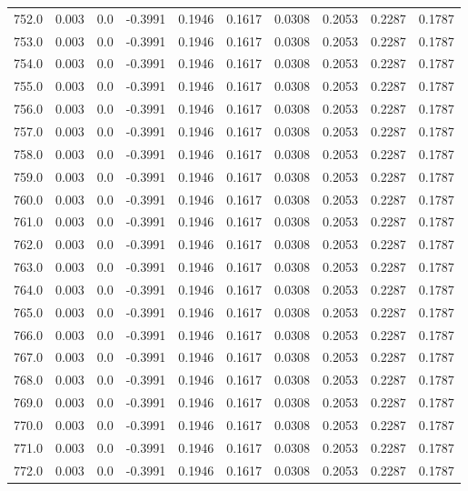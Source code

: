 \begin{longtable}{lrrrrrrrrr}
752.0 & 0.003 & 0.0 & -0.3991 & 0.1946 & 0.1617 & 0.0308 & 0.2053 & 0.2287 & 0.1787 \\
753.0 & 0.003 & 0.0 & -0.3991 & 0.1946 & 0.1617 & 0.0308 & 0.2053 & 0.2287 & 0.1787 \\
754.0 & 0.003 & 0.0 & -0.3991 & 0.1946 & 0.1617 & 0.0308 & 0.2053 & 0.2287 & 0.1787 \\
755.0 & 0.003 & 0.0 & -0.3991 & 0.1946 & 0.1617 & 0.0308 & 0.2053 & 0.2287 & 0.1787 \\
756.0 & 0.003 & 0.0 & -0.3991 & 0.1946 & 0.1617 & 0.0308 & 0.2053 & 0.2287 & 0.1787 \\
757.0 & 0.003 & 0.0 & -0.3991 & 0.1946 & 0.1617 & 0.0308 & 0.2053 & 0.2287 & 0.1787 \\
758.0 & 0.003 & 0.0 & -0.3991 & 0.1946 & 0.1617 & 0.0308 & 0.2053 & 0.2287 & 0.1787 \\
759.0 & 0.003 & 0.0 & -0.3991 & 0.1946 & 0.1617 & 0.0308 & 0.2053 & 0.2287 & 0.1787 \\
760.0 & 0.003 & 0.0 & -0.3991 & 0.1946 & 0.1617 & 0.0308 & 0.2053 & 0.2287 & 0.1787 \\
761.0 & 0.003 & 0.0 & -0.3991 & 0.1946 & 0.1617 & 0.0308 & 0.2053 & 0.2287 & 0.1787 \\
762.0 & 0.003 & 0.0 & -0.3991 & 0.1946 & 0.1617 & 0.0308 & 0.2053 & 0.2287 & 0.1787 \\
763.0 & 0.003 & 0.0 & -0.3991 & 0.1946 & 0.1617 & 0.0308 & 0.2053 & 0.2287 & 0.1787 \\
764.0 & 0.003 & 0.0 & -0.3991 & 0.1946 & 0.1617 & 0.0308 & 0.2053 & 0.2287 & 0.1787 \\
765.0 & 0.003 & 0.0 & -0.3991 & 0.1946 & 0.1617 & 0.0308 & 0.2053 & 0.2287 & 0.1787 \\
766.0 & 0.003 & 0.0 & -0.3991 & 0.1946 & 0.1617 & 0.0308 & 0.2053 & 0.2287 & 0.1787 \\
767.0 & 0.003 & 0.0 & -0.3991 & 0.1946 & 0.1617 & 0.0308 & 0.2053 & 0.2287 & 0.1787 \\
768.0 & 0.003 & 0.0 & -0.3991 & 0.1946 & 0.1617 & 0.0308 & 0.2053 & 0.2287 & 0.1787 \\
769.0 & 0.003 & 0.0 & -0.3991 & 0.1946 & 0.1617 & 0.0308 & 0.2053 & 0.2287 & 0.1787 \\
770.0 & 0.003 & 0.0 & -0.3991 & 0.1946 & 0.1617 & 0.0308 & 0.2053 & 0.2287 & 0.1787 \\
771.0 & 0.003 & 0.0 & -0.3991 & 0.1946 & 0.1617 & 0.0308 & 0.2053 & 0.2287 & 0.1787 \\
772.0 & 0.003 & 0.0 & -0.3991 & 0.1946 & 0.1617 & 0.0308 & 0.2053 & 0.2287 & 0.1787 \\

\end{longtable}
